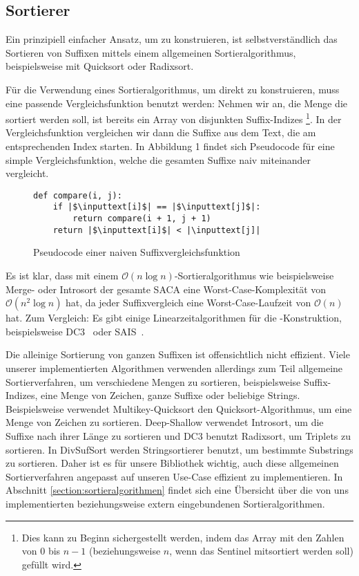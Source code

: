 \subsection{Sortierer}
Ein  prinzipiell einfacher Ansatz, um \sa zu konstruieren,
ist selbstverständlich das Sortieren von Suffixen mittels einem allgemeinen Sortieralgorithmus,
beispielsweise mit Quicksort oder Radixsort.

Für die Verwendung eines Sortieralgorithmus, um \sa direkt zu konstruieren,
muss eine passende Vergleichsfunktion benutzt werden:
Nehmen wir an, die Menge die sortiert werden soll, ist bereits ein Array von disjunkten Suffix-Indizes
\footnote{Dies kann zu Beginn sichergestellt werden, indem das
Array mit den Zahlen von 0 bis $n-1$ (beziehungsweise $n$, wenn das Sentinel mitsortiert werden soll) gefüllt wird.}.
In der Vergleichsfunktion vergleichen wir dann die Suffixe aus dem Text, die am entsprechenden Index starten.
In Abbildung 1 findet sich Pseudocode für eine simple Vergleichsfunktion,
welche die gesamten Suffixe naiv miteinander vergleicht.

\begin{figure}[!h]
\begin{verbatim}
def compare(i, j):
    if |$\inputtext[i]$| == |$\inputtext[j]$|:
        return compare(i + 1, j + 1)
    return |$\inputtext[i]$| < |\inputtext[j]|
\end{verbatim}
\caption{Pseudocode einer naiven Suffixvergleichsfunktion}
\end{figure}
%
Es ist klar, dass mit einem $\mathcal O(n \log n)$-Sortieralgorithmus wie beispielsweise Merge- oder Introsort
der gesamte SACA eine Worst-Case-Komplexität von\\ $\mathcal O(n^2 \log n)$ hat, da jeder Suffixvergleich
eine Worst-Case-Laufzeit von $\mathcal O(n)$ hat.
Zum Vergleich: Es gibt einige Linearzeitalgorithmen für die \sa-Konstruktion, beispielsweise DC3~\cite{saca:9} oder SAIS~\cite{saca:6}.

Die alleinige Sortierung von ganzen Suffixen ist offensichtlich nicht effizient.
Viele unserer implementierten Algorithmen verwenden allerdings zum Teil allgemeine Sortierverfahren,
um verschiedene Mengen zu sortieren,
beispielsweise Suffix-Indizes, eine Menge von Zeichen, ganze Suffixe oder beliebige Strings.
Beispielsweise verwendet Multikey-Quicksort den Quicksort-Algorithmus, um eine Menge von Zeichen zu sortieren.
Deep-Shallow verwendet Introsort, um die Suffixe nach ihrer Länge zu sortieren
und DC3 benutzt Radixsort, um Triplets zu sortieren.
In DivSufSort werden Stringsortierer benutzt, um bestimmte Substrings zu sortieren.
Daher ist es für unsere Bibliothek wichtig, auch diese allgemeinen Sortierverfahren angepasst
auf unseren Use-Case effizient zu implementieren.
In Abschnitt \ref{section:sortieralgorithmen} findet sich eine Übersicht über die von uns
implementierten beziehungsweise extern eingebundenen Sortieralgorithmen.
